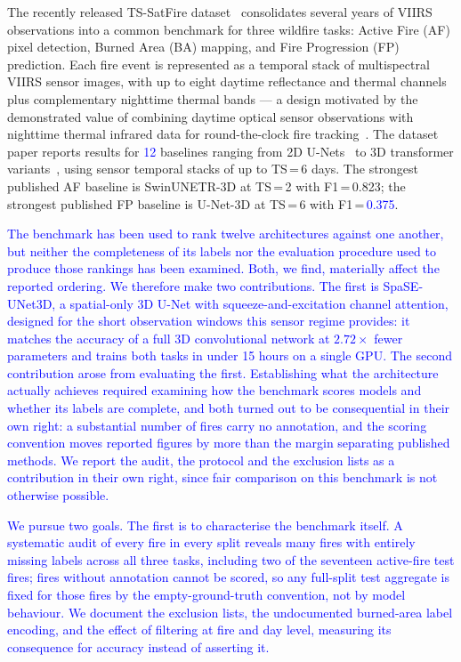 \documentclass[sensors,article,submit,moreauthors,pdftex]{Definitions/mdpi}
\newcommand{\rev}[1]{\textcolor{blue}{#1}}
\begin{document}
The recently released TS-SatFire dataset~\cite{zhao2025tssatfire}
consolidates several years of VIIRS  observations into a
common benchmark for three wildfire tasks: Active Fire (AF) pixel
detection, Burned Area (BA) mapping, and Fire Progression (FP)
prediction. Each fire event is represented as a temporal stack of
multispectral VIIRS sensor images, with up to eight daytime
reflectance and thermal  channels plus complementary
nighttime thermal  bands — a design motivated by the
demonstrated value of combining daytime optical sensor observations
with nighttime thermal infrared  data for round-the-clock
fire tracking~\cite{chiang2019mapping}. The dataset paper reports
results for \rev{12} baselines ranging from 2D U-Nets~\cite{ronneberger2015unet}
to 3D transformer variants~\cite{hatamizadeh2022swin,hatamizadeh2022unetr},
using sensor temporal stacks of up to TS\,=\,6 days. The strongest
published AF baseline is SwinUNETR-3D at TS\,=\,2 with F1\,=\,0.823;
the strongest published FP baseline is U-Net-3D at TS\,=\,6 with
F1\,=\,\rev{0.375}.

\rev{The benchmark has been used to rank \rev{twelve} architectures against one
another, but neither the completeness of its labels nor the evaluation
procedure used to produce those rankings has been examined. Both, we find,
materially affect the reported ordering. We therefore make two contributions. The first is SpaSE-UNet3D, a
spatial-only 3D U-Net with squeeze-and-excitation channel attention, designed
for the short observation windows this sensor regime provides: it matches the
accuracy of a full 3D convolutional network at $2.72\times$ fewer parameters and
trains both tasks in under 15 hours on a single GPU. The second contribution
arose from evaluating the first. Establishing what the architecture actually
achieves required examining how the benchmark scores models and whether its
labels are complete, and both turned out to be consequential in their own
right: a substantial number of fires carry no annotation, and the scoring
convention moves reported figures by more than the margin separating published
methods. We report the audit, the protocol and the exclusion lists as a
contribution in their own right, since fair comparison on this benchmark is not
otherwise possible.}

\rev{We pursue two goals. The first is to characterise the benchmark itself. A
systematic audit of every fire in every split reveals many fires with entirely
missing labels across all three tasks, including two of the seventeen
active-fire test fires; fires without annotation cannot be scored, so any
full-split test aggregate is fixed for those fires by the empty-ground-truth
convention, not by model behaviour. We document the exclusion lists, the
undocumented burned-area label encoding, and the effect of filtering at fire and
day level, measuring its consequence for accuracy instead of asserting it.}
\end{document}
